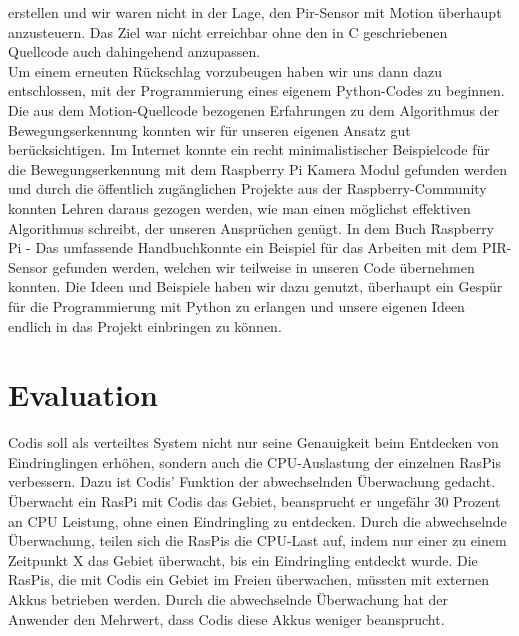 \documentclass[journal]{IEEEtran}
\begin{document}
erstellen und wir waren nicht in der Lage, den Pir-Sensor mit Motion überhaupt anzusteuern. Das Ziel war nicht erreichbar ohne den in C geschriebenen Quellcode auch dahingehend anzupassen. \\ Um einem erneuten Rückschlag vorzubeugen haben wir uns dann dazu entschlossen, mit der Programmierung eines eigenem Python-Codes zu beginnen. Die aus dem Motion-Quellcode bezogenen Erfahrungen zu dem Algorithmus der Bewegungserkennung konnten wir für unseren eigenen Ansatz gut berücksichtigen. Im Internet konnte ein recht minimalistischer Beispielcode für die Bewegungserkennung mit dem Raspberry Pi Kamera Modul gefunden werden\cite{motioncode} und durch die öffentlich zugänglichen Projekte aus der Raspberry-Community konnten Lehren daraus gezogen werden, wie man einen möglichst effektiven Algorithmus schreibt, der unseren Ansprüchen genügt. In dem Buch \"Raspberry Pi - Das umfassende Handbuch\" konnte ein Beispiel für das Arbeiten mit dem PIR-Sensor gefunden werden\cite[S. 495]{Raspi}, welchen wir teilweise in unseren Code übernehmen konnten. Die Ideen und Beispiele haben wir dazu genutzt, überhaupt ein Gespür für die Programmierung mit Python zu erlangen und unsere eigenen Ideen endlich in das Projekt einbringen zu können. \\



\section{Evaluation}

Codis soll als verteiltes System nicht nur seine Genauigkeit beim Entdecken von Eindringlingen erhöhen, sondern auch die CPU-Auslastung der einzelnen RasPis verbessern. Dazu ist Codis' Funktion der abwechselnden Überwachung gedacht. Überwacht ein RasPi mit Codis das Gebiet, beansprucht er ungefähr 30 Prozent an CPU Leistung, ohne einen Eindringling zu entdecken. Durch die abwechselnde Überwachung, teilen sich die RasPis die CPU-Last auf, indem nur einer zu einem Zeitpunkt X das Gebiet überwacht, bis ein Eindringling entdeckt wurde. Die RasPis, die mit Codis ein Gebiet im Freien überwachen, müssten mit externen Akkus betrieben werden. Durch die abwechselnde Überwachung hat der Anwender den Mehrwert, dass Codis diese Akkus weniger beansprucht.
\end{document}
